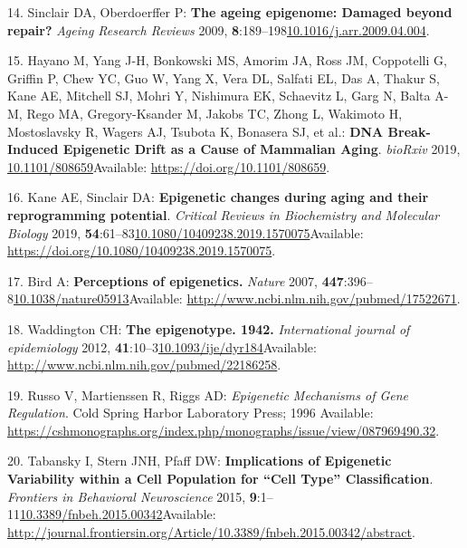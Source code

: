 \documentclass[
]{book}
\begin{document}
\leavevmode\hypertarget{ref-Sinclair2009}{}%
14. Sinclair DA, Oberdoerffer P: \textbf{The ageing epigenome: Damaged beyond repair?} \emph{Ageing Research Reviews} 2009, \textbf{8}:189--198\href{https://doi.org/10.1016/j.arr.2009.04.004}{10.1016/j.arr.2009.04.004}.

\leavevmode\hypertarget{ref-Hayano2019}{}%
15. Hayano M, Yang J-H, Bonkowski MS, Amorim JA, Ross JM, Coppotelli G, Griffin P, Chew YC, Guo W, Yang X, Vera DL, Salfati EL, Das A, Thakur S, Kane AE, Mitchell SJ, Mohri Y, Nishimura EK, Schaevitz L, Garg N, Balta A-M, Rego MA, Gregory-Ksander M, Jakobs TC, Zhong L, Wakimoto H, Mostoslavsky R, Wagers AJ, Tsubota K, Bonasera SJ, et al.: \textbf{DNA Break-Induced Epigenetic Drift as a Cause of Mammalian Aging}. \emph{bioRxiv} 2019, \href{https://doi.org/10.1101/808659}{10.1101/808659}Available: \url{https://doi.org/10.1101/808659}.

\leavevmode\hypertarget{ref-Kane2019}{}%
16. Kane AE, Sinclair DA: \textbf{Epigenetic changes during aging and their reprogramming potential}. \emph{Critical Reviews in Biochemistry and Molecular Biology} 2019, \textbf{54}:61--83\href{https://doi.org/10.1080/10409238.2019.1570075}{10.1080/10409238.2019.1570075}Available: \url{https://doi.org/10.1080/10409238.2019.1570075}.

\leavevmode\hypertarget{ref-Bird2007}{}%
17. Bird A: \textbf{Perceptions of epigenetics.} \emph{Nature} 2007, \textbf{447}:396--8\href{https://doi.org/10.1038/nature05913}{10.1038/nature05913}Available: \url{http://www.ncbi.nlm.nih.gov/pubmed/17522671}.

\leavevmode\hypertarget{ref-Waddington1942}{}%
18. Waddington CH: \textbf{The epigenotype. 1942.} \emph{International journal of epidemiology} 2012, \textbf{41}:10--3\href{https://doi.org/10.1093/ije/dyr184}{10.1093/ije/dyr184}Available: \url{http://www.ncbi.nlm.nih.gov/pubmed/22186258}.

\leavevmode\hypertarget{ref-Russo1996}{}%
19. Russo V, Martienssen R, Riggs AD: \emph{Epigenetic Mechanisms of Gene Regulation}. Cold Spring Harbor Laboratory Press; 1996 Available: \url{https://cshmonographs.org/index.php/monographs/issue/view/087969490.32}.

\leavevmode\hypertarget{ref-Tabansky2015}{}%
20. Tabansky I, Stern JNH, Pfaff DW: \textbf{Implications of Epigenetic Variability within a Cell Population for ``Cell Type'' Classification}. \emph{Frontiers in Behavioral Neuroscience} 2015, \textbf{9}:1--11\href{https://doi.org/10.3389/fnbeh.2015.00342}{10.3389/fnbeh.2015.00342}Available: \url{http://journal.frontiersin.org/Article/10.3389/fnbeh.2015.00342/abstract}.
\end{document}
